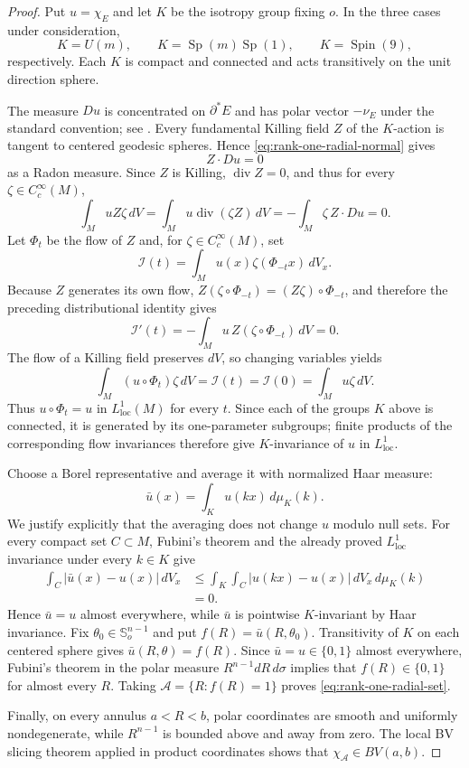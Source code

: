 \documentclass[11pt,reqno]{amsart}
\numberwithin{equation}{section}
\theoremstyle{definition}
\theoremstyle{remark}
\begin{document}
\begin{proof}
Put $u=\chi_E$ and let $K$ be the isotropy group fixing $o$.  In the three
cases under consideration,
\[
 K=U(m),\qquad K=\operatorname{Sp}(m)\operatorname{Sp}(1),
 \qquad K=\operatorname{Spin}(9),
\]
respectively.  Each $K$ is compact and connected and acts transitively on the
unit direction sphere.

The measure $Du$ is concentrated on $\partial^*E$ and has polar vector
$-\nu_E$ under the standard convention; see \cite{AFP2000,Maggi2012}.  Every
fundamental Killing field $Z$ of the $K$-action is tangent to centered
geodesic spheres.  Hence \eqref{eq:rank-one-radial-normal} gives
\[
 Z\cdot Du=0
\]
as a Radon measure.  Since $Z$ is Killing, $\operatorname{div}Z=0$, and thus
for every $\zeta\in C_c^\infty(M)$,
\[
 \int_MuZ\zeta\,dV
 =\int_Mu\operatorname{div}(\zeta Z)\,dV
 =-\int_M\zeta\,Z\cdot Du=0.
\]
Let $\Phi_t$ be the flow of $Z$ and, for
$\zeta\in C_c^\infty(M)$, set
\[
 \mathcal I(t)=\int_Mu(x)\zeta(\Phi_{-t}x)\,dV_x.
\]
Because $Z$ generates its own flow,
$Z(\zeta\circ\Phi_{-t})=(Z\zeta)\circ\Phi_{-t}$, and therefore the preceding
distributional identity gives
\[
 \mathcal I'(t)
 =-\int_Mu\,Z(\zeta\circ\Phi_{-t})\,dV
 =0.
\]
The flow of a Killing field preserves $dV$, so changing variables yields
\[
 \int_M (u\circ\Phi_t)\zeta\,dV
 =\mathcal I(t)=\mathcal I(0)
 =\int_Mu\zeta\,dV.
\]
Thus $u\circ\Phi_t=u$ in $L^1_{\mathrm{loc}}(M)$ for every $t$.  Since each of
the groups $K$ above is connected, it is generated by its one-parameter
subgroups; finite products of the corresponding flow invariances therefore give
$K$-invariance of $u$ in $L^1_{\mathrm{loc}}$.

Choose a Borel representative and average it with normalized Haar measure:
\[
 \bar u(x)=\int_Ku(kx)\,d\mu_K(k).
\]
We justify explicitly that the averaging does not change $u$ modulo null sets.
For every compact set $C\subset M$, Fubini's theorem and the already proved
$L^1_{\mathrm{loc}}$ invariance under every $k\in K$ give
\[
\begin{aligned}
\int_C|\bar u(x)-u(x)|\,dV_x
&\le
\int_K\int_C|u(kx)-u(x)|\,dV_x\,d\mu_K(k)\\
&=0.
\end{aligned}
\]
Hence $\bar u=u$ almost everywhere, while $\bar u$ is pointwise $K$-invariant
by Haar invariance.  Fix $\theta_0\in\mathbb S_o^{n-1}$ and put
$f(R)=\bar u(R,\theta_0)$.  Transitivity of $K$ on each centered sphere gives
$\bar u(R,\theta)=f(R)$.  Since $\bar u=u\in\{0,1\}$ almost everywhere,
Fubini's theorem in the polar measure
$R^{n-1}dR\,d\sigma$ implies that $f(R)\in\{0,1\}$ for almost every $R$.
Taking $\mathscr A=\{R:f(R)=1\}$ proves \eqref{eq:rank-one-radial-set}.

Finally, on every annulus $a<R<b$, polar coordinates are smooth and uniformly
nondegenerate, while $R^{n-1}$ is bounded above and away from zero.  The local
BV slicing theorem \cite[Theorem~3.103 and Remark~3.104]{AFP2000} applied in
product coordinates shows that $\chi_{\mathscr A}\in BV(a,b)$.
\end{proof}
\end{document}
